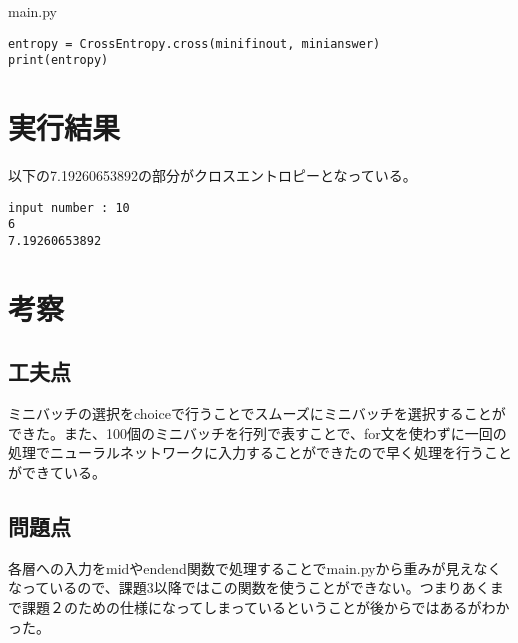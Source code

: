 \documentclass{ujarticle}
\begin{document}
main.py
\begin{lstlisting}[basicstyle=\ttfamily\footnotesize, frame=single]
entropy = CrossEntropy.cross(minifinout, minianswer)
print(entropy)
\end{lstlisting}

\section{実行結果}
以下の7.19260653892の部分がクロスエントロピーとなっている。
\begin{lstlisting}[basicstyle=\ttfamily\footnotesize, frame=single]
input number : 10
6
7.19260653892
\end{lstlisting}

\section{考察}
\subsection{工夫点}
ミニバッチの選択をchoiceで行うことでスムーズにミニバッチを選択することができた。また、100個のミニバッチを行列で表すことで、for文を使わずに一回の処理でニューラルネットワークに入力することができたので早く処理を行うことができている。

\subsection{問題点}
各層への入力をmidやendend関数で処理することでmain.pyから重みが見えなくなっているので、課題3以降ではこの関数を使うことができない。つまりあくまで課題２のための仕様になってしまっているということが後からではあるがわかった。
\end{document}
